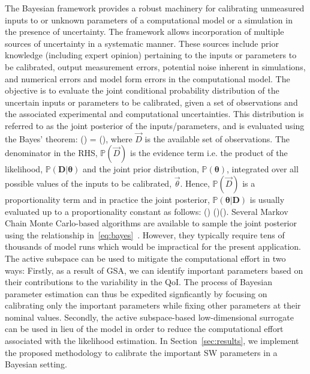 The Bayesian framework provides a robust machinery for calibrating unmeasured inputs to 
or unknown parameters of a computational model or
a simulation in the presence of uncertainty. The framework allows incorporation of multiple
sources of uncertainty in a systematic manner. These sources include prior knowledge
(including expert opinion)
 pertaining to the inputs or parameters to be calibrated, output measurement errors, potential noise inherent
in simulations, and numerical errors and model form errors in the computational model.
 The objective is to evaluate the joint
conditional probability distribution of the uncertain inputs or parameters to be calibrated,
given a set of observations and the
associated experimental and computational uncertainties. This distribution is referred to as
the joint posterior of the inputs/parameters, and is evaluated using the Bayes' theorem:
%
\be
{}(\bm{\theta}\vert {}) = 
(\bm{\theta}),
\ee
%
where $\vec{D}$ is the available set of observations. 
The denominator in the RHS, $\mathbb{P}(\vec{D})$ is the evidence term i.e. the product of the likelihood, 
$\mathbb{P}(\bm{D}\vert\bm{\theta})$ and the joint prior distribution,
$\mathbb{P}(\bm{\theta})$, integrated over all possible values of the inputs to be calibrated, $\vec{\theta}$. 
Hence, $\mathbb{P}(\vec{D})$ is a proportionality term and in practice the joint posterior, 
$\mathbb{P}(\bm{\theta}\vert \bm{D})$ is usually evaluated up to a proportionality constant as follows:
%
\be
{}(\bm{\theta}\vert {}) \propto
{}(\vert\bm{\theta})(\bm{\theta}).
\label{eq:bayes}
\ee
%
Several Markov Chain Monte Carlo-based algorithms are available to sample the joint posterior using the
relationship in~\eqref{eq:bayes}~\cite{Haario:2001, Haario:2006,Xu:2014}.
However, they typically require tens of thousands of model runs which would be
impractical for the present application. The active subspace can be used to mitigate the
computational effort in two ways: Firstly, as a result of GSA, we can identify important parameters based on
their contributions to the variability in the QoI. The process of Bayesian parameter estimation
can thus be expedited signficantly by focusing on calibrating only the important parameters while fixing other
parameters at their nominal values. Secondly, the active subspace-based low-dimensional
surrogate can be used in lieu of the model in order to reduce the computational effort associated with the
likelihood estimation. In Section~\ref{sec:results}, we implement the proposed methodology to calibrate the
important SW parameters in a Bayesian setting. 




